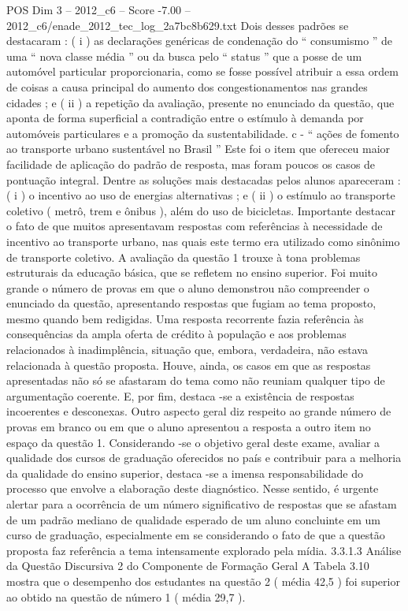 \begin{textsample}{POS Dim 3 – 2012\_c6 – Score -7.00 – 2012\_c6/enade\_2012\_tec\_log\_2a7bc8b629.txt}
Dois desses padrões se destacaram : ( i ) as declarações genéricas de condenação do “ consumismo ” de uma “ nova classe média ” ou da busca pelo “ status ” que a posse de um automóvel particular proporcionaria, como se fosse possível atribuir a essa ordem de coisas a causa principal do aumento dos congestionamentos nas grandes cidades ; e ( ii ) a repetição da avaliação, presente no enunciado da questão, que aponta de forma superficial a contradição entre o estímulo à demanda por automóveis particulares e a promoção da sustentabilidade. c - “ ações de fomento ao transporte urbano sustentável no Brasil ” Este foi o item que ofereceu maior facilidade de aplicação do padrão de resposta, mas foram poucos os casos de pontuação integral.
Dentre as soluções mais destacadas pelos alunos apareceram : ( i ) o incentivo ao uso de energias alternativas ; e ( ii ) o estímulo ao transporte coletivo ( metrô, trem e ônibus ), além do uso de bicicletas.
Importante destacar o fato de que muitos apresentavam respostas com referências à necessidade de incentivo ao transporte urbano, nas quais este termo era utilizado como sinônimo de transporte coletivo.
A avaliação da questão 1 trouxe à tona problemas estruturais da educação básica, que se refletem no ensino superior.
Foi muito grande o número de provas em que o aluno demonstrou não compreender o enunciado da questão, apresentando respostas que fugiam ao tema proposto, mesmo quando bem redigidas.
Uma resposta recorrente fazia referência às consequências da ampla oferta de crédito à população e aos problemas relacionados à inadimplência, situação que, embora, verdadeira, não estava relacionada à questão proposta.
Houve, ainda, os casos em que as respostas apresentadas não só se afastaram do tema como não reuniam qualquer tipo de argumentação coerente.
E, por fim, destaca -se a existência de respostas incoerentes e desconexas.
Outro aspecto geral diz respeito ao grande número de provas em branco ou em que o aluno apresentou a resposta a outro item no espaço da questão 1.
Considerando -se o objetivo geral deste exame, avaliar a qualidade dos cursos de graduação oferecidos no país e contribuir para a melhoria da qualidade do ensino superior, destaca -se a imensa responsabilidade do processo que envolve a elaboração deste diagnóstico.
Nesse sentido, é urgente alertar para a ocorrência de um número significativo de respostas que se afastam de um padrão mediano de qualidade esperado de um aluno concluinte em um curso de graduação, especialmente em se considerando o fato de que a questão proposta faz referência a tema intensamente explorado pela mídia. 3.3.1.3 Análise da Questão Discursiva 2 do Componente de Formação Geral A Tabela 3.10 mostra que o desempenho dos estudantes na questão 2 ( média 42,5 ) foi superior ao obtido na questão de número 1 ( média 29,7 ).

\end{textsample}
